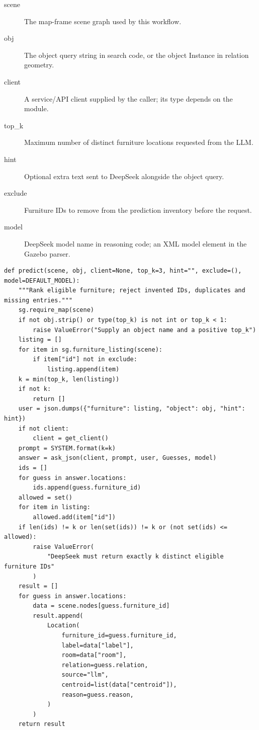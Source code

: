 \documentclass[11pt,a4paper]{book}
\begin{document}
\begin{description}
\item[scene] The map-frame scene graph used by this workflow.
\item[obj] The object query string in search code, or the object Instance in relation geometry.
\item[client] A service/API client supplied by the caller; its type depends on the module.
\item[top\_k] Maximum number of distinct furniture locations requested from the LLM.
\item[hint] Optional extra text sent to DeepSeek alongside the object query.
\item[exclude] Furniture IDs to remove from the prediction inventory before the request.
\item[model] DeepSeek model name in reasoning code; an XML model element in the Gazebo parser.
\end{description}

\begin{lstlisting}[firstnumber=60]
def predict(scene, obj, client=None, top_k=3, hint="", exclude=(), model=DEFAULT_MODEL):
    """Rank eligible furniture; reject invented IDs, duplicates and missing entries."""
    sg.require_map(scene)
    if not obj.strip() or type(top_k) is not int or top_k < 1:
        raise ValueError("Supply an object name and a positive top_k")
    listing = []
    for item in sg.furniture_listing(scene):
        if item["id"] not in exclude:
            listing.append(item)
    k = min(top_k, len(listing))
    if not k:
        return []
    user = json.dumps({"furniture": listing, "object": obj, "hint": hint})
    if not client:
        client = get_client()
    prompt = SYSTEM.format(k=k)
    answer = ask_json(client, prompt, user, Guesses, model)
    ids = []
    for guess in answer.locations:
        ids.append(guess.furniture_id)
    allowed = set()
    for item in listing:
        allowed.add(item["id"])
    if len(ids) != k or len(set(ids)) != k or (not set(ids) <= allowed):
        raise ValueError(
            "DeepSeek must return exactly k distinct eligible furniture IDs"
        )
    result = []
    for guess in answer.locations:
        data = scene.nodes[guess.furniture_id]
        result.append(
            Location(
                furniture_id=guess.furniture_id,
                label=data["label"],
                room=data["room"],
                relation=guess.relation,
                source="llm",
                centroid=list(data["centroid"]),
                reason=guess.reason,
            )
        )
    return result


\end{lstlisting}
\end{document}
